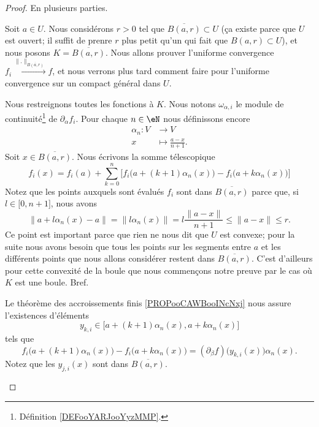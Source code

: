 \begin{proof}
	En plusieurs parties.
	\begin{subproof}
		Soit \( a\in U\). Nous considérons \( r>0\) tel que \( \overline{ B(a,r) }\subset U\) (ça existe parce que \( U\) est ouvert; il suffit de prenre \( r\) plus petit qu'un qui fait que \( B(a,r)\subset U\)), et nous posons \( K=\overline{ B(a,r) }\). Nous allons prouver l'uniforme convergence \( f_i\stackrel{\|  .\|_{\overline{ B(a,r) }}}{\longrightarrow}f\), et nous verrons plus tard comment faire pour l'uniforme convergence sur un compact général dans \( U\).

		Nous restreignons toutes les fonctions à \( K\). Nous notons \( \omega_{\alpha, i}\) le module de continuité\footnote{Définition \ref{DEFooYARJooYyzMMP}.} de \( \partial_{\alpha}f_i\). Pour chaque \( n\in \eN\) nous définissons encore
		\begin{equation}
			\begin{aligned}
				\alpha_n\colon V & \to V                        \\
				x                & \mapsto \frac{ a-x }{ n+1 }.
			\end{aligned}
		\end{equation}
		Soit \( x\in \overline{ B(a,r) }\). Nous écrivons la somme télescopique
		\begin{equation}        \label{EQooMXVLooXFceGH}
			f_i(x)=f_i(a)+\sum_{k=0}^n\big[ f_i\big(a+(k+1)\alpha_n(x)\big)-f_i\big(a+k\alpha_n(x)\big) \big]
		\end{equation}
		Notez que les points auxquels sont évalués \( f_i\) sont dans \( \overline{ B(a,r) }\) parce que, si \( l\in \mathopen[ 0 , n+1 \mathclose]\), nous avons
		\begin{equation}
			\| a+l\alpha_n(x)-a \|=\| l\alpha_n(x) \|
			=l\frac{ \| a-x \| }{ n+1 }
			\leq\| a-x \|
			\leq r.
		\end{equation}
		Ce point est important parce que rien ne nous dit que \(U\) est convexe; pour la suite nous avons besoin que tous les points sur les segments entre \( a\) et les différents points que nous allons considérer restent dans \( \overline{ B(a,r) }\). C'est d'ailleurs pour cette convexité de la boule que nous commençons notre preuve par le cas où \( K\) est une boule. Bref.

		Le théorème des accroissements finis \ref{PROPooCAWBooINcNxj} nous assure l'existences d'éléments
		\begin{equation}
			y_{k,i}\in \mathopen\big[ a+(k+1)\alpha_n(x)   , a+k\alpha_n(x) \mathclose\big]
		\end{equation}
		tels que
		\begin{equation}
			f_i\big( a+(k+1)\alpha_n(x) \big)-f_i\big( a+k\alpha_n(x) \big)=(\partial_{\beta}f)\big( y_{k,i}(x) \big)\alpha_n(x).
		\end{equation}
		Notez que les \( y_{j,i}(x)\) sont dans \( \overline{ B(a,r) }\).


\end{subproof}
\end{proof}
